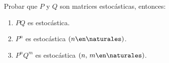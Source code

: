 \begin{enunciado}{\ejercicio}
  Probar que $P$ y $Q$ son matrices estocásticas, entonces:
  \begin{enumerate}[label=(\alph*)]
    \item $PQ$ es estocástica.
    \item $P^n$ es estocástica $(n \en \naturales)$.
    \item $P^nQ^m$ es estocástica $(n,\, m \en \naturales)$.
  \end{enumerate}
\end{enunciado}

\hacer
